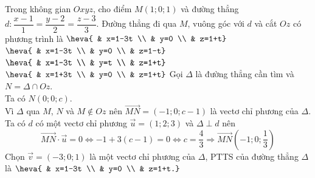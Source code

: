 \begin{ex}%
	Trong không gian $Oxyz$, cho điểm $M(1;0;1)$ và đường thẳng $d\colon \dfrac{x-1}{1}=\dfrac{y-2}{2}=\dfrac{z-3}{3}$. Đường thẳng đi qua $M$, vuông góc với $d$ và cắt $Oz$ có phương trình là
	\choice
	{\True $\heva{ & x=1-3t \\ & y=0 \\ & z=1+t}$}
	{$\heva{ & x=1-3t \\ & y=0 \\ & z=1-t}$}
	{$\heva{ & x=1-3t \\ & y=t \\ & z=1+t}$}
	{$\heva{ & x=1+3t \\ & y=0 \\ & z=1+t}$}
	\loigiai
	{
		Gọi $\Delta$ là đường thẳng cần tìm và $N=\Delta \cap Oz$.\\
		Ta có $N(0;0;c)$. \\
		Vì $\Delta$ qua $M$, $N$ và $M\notin Oz$ nên $\overrightarrow{MN}=(-1;0;c-1)$ là vectơ chỉ phương của $\Delta$.\\
		Ta có $d$ có một vectơ chỉ phương $\overrightarrow{u}=(1;2;3)$ và $\Delta \perp d$ nên
		\[\overrightarrow{MN}\cdot\overrightarrow{u}=0 \Leftrightarrow -1+3(c-1)=0 \Leftrightarrow c=\dfrac{4}{3} \Rightarrow \overrightarrow{MN}\left(-1;0;\dfrac{1}{3}\right)\]
		Chọn $\overrightarrow{v}=(-3;0;1)$ là một vectơ chỉ phương của $\Delta$, PTTS của đường thẳng $\Delta$ là $\heva{ & x=1-3t \\ & y=0 \\ & z=1+t.}$
	}
\end{ex}

